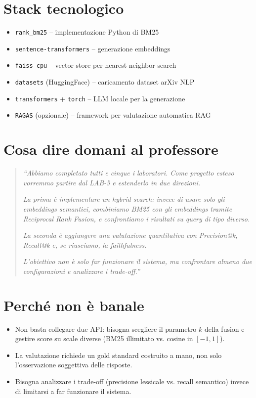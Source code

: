 \documentclass[12pt,a4paper]{article}
\begin{document}
\section{Stack tecnologico}

\begin{itemize}
  \item \texttt{rank\_bm25} -- implementazione Python di BM25
  \item \texttt{sentence-transformers} -- generazione embeddings
  \item \texttt{faiss-cpu} -- vector store per nearest neighbor search
  \item \texttt{datasets} (HuggingFace) -- caricamento dataset arXiv NLP
  \item \texttt{transformers} + \texttt{torch} -- LLM locale per la generazione
  \item \texttt{RAGAS} (opzionale) -- framework per valutazione automatica RAG
\end{itemize}

\section{Cosa dire domani al professore}

\begin{quote}
\textit{``Abbiamo completato tutti e cinque i laboratori. Come progetto esteso vorremmo partire dal LAB-5 e estenderlo in due direzioni.}

\textit{La prima \`e implementare un hybrid search: invece di usare solo gli embeddings semantici, combiniamo BM25 con gli embeddings tramite Reciprocal Rank Fusion, e confrontiamo i risultati su query di tipo diverso.}

\textit{La seconda \`e aggiungere una valutazione quantitativa con Precision@k, Recall@k e, se riusciamo, la faithfulness.}

\textit{L'obiettivo non \`e solo far funzionare il sistema, ma confrontare almeno due configurazioni e analizzare i trade-off.''}
\end{quote}

\section{Perch\'e non \`e banale}

\begin{itemize}
  \item Non basta collegare due API: bisogna scegliere il parametro $k$ della fusion e gestire score su scale diverse (BM25 illimitato vs. cosine in $[-1,1]$).
  \item La valutazione richiede un gold standard costruito a mano, non solo l'osservazione soggettiva delle risposte.
  \item Bisogna analizzare i trade-off (precisione lessicale vs. recall semantico) invece di limitarsi a far funzionare il sistema.
\end{itemize}
\end{document}
